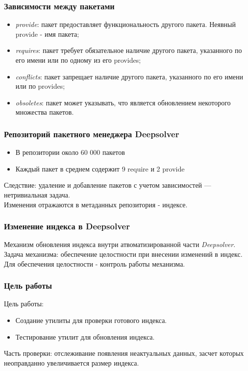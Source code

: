\documentclass{beamer}
\begin{document}
\begin{frame}
\frametitle{Зависимости между пакетами}
\begin{itemize}
\item
\textit{provide}: пакет предоставляет функциональность другого пакета. Неявный
provide - имя пакета;
\item
\textit{requires}: пакет требует обязательное наличие другого пакета, указанного 
по его имени или по одному из его provides;
\item
\textit{conflicts}: пакет запрещает наличие другого пакета, указанного по его имени 
или по provides;
\item 
\textit{obsoletes}: пакет может указывать, что является обновлением некоторого 
множества пакетов. 
\end{itemize}

\end{frame}

\begin{frame}
\frametitle{Репозиторий пакетного менеджера Deepsolver}
\begin{itemize}
\item
В репозитории около 60 000 пакетов
\item
Каждый пакет в среднем содержит 9 require и 2 provide
\end{itemize}

Следствие: удаление и добавление пакетов с учетом зависимостей ---
нетривиальная задача.\\

Изменения отражаются в метаданных репозитория - индексе.
\end{frame}

\begin{frame}
\frametitle{Изменение индекса в Deepsolver}
Механизм обновления индекса внутри атвоматизированной части  \textit{Deepsolver}.\\
\vspace{0.5cm}
Задача механизма: обеспечение целостности при внесении изменений в индекс.\\
\vspace{0.5cm}
Для обеспечения целостности - контроль работы механизма.

\end{frame}

\begin{frame}
\frametitle{Цель работы}
Цель работы:
\begin{itemize}
\item
Создание утилиты для проверки готового индекса.
\item
Тестирование утилит для обновления индекса.
\end{itemize}
\vspace{0.5cm}
Часть проверки: отслеживание появления
неактуальных данных, засчет которых неоправданно увеличивается размер индекса.
\end{frame}
\end{document}
